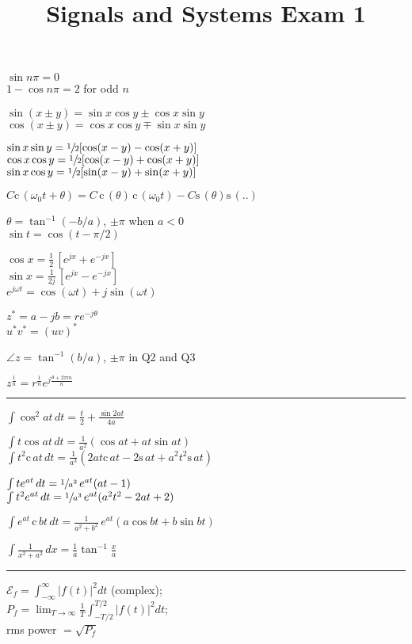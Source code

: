 \documentclass[6pt]{article}
\title{Signals and Systems Exam 1}
\theoremstyle{definition}
\theoremstyle{definition}
\renewcommand{\c}{\mathrm{c}\,}
\newcommand{\s}{\mathrm{s}\,}
\begin{document}
\raggedright
\begin{multicols*}{3} %
    $\sin n\pi = 0$\\
    $1-\cos n\pi = 2$ for odd $n$

    $\sin(x\pm y) = \sin x \cos y \pm \cos x \sin y$\\
    $\cos(x\pm y) = \cos x \cos y \mp \sin x \sin y$

    $\sin x \sin y = \sfrac{1}{2}[\cos(x-y) - \cos(x+y)]$\\
    $\cos x \cos y = \sfrac{1}{2}[\cos(x-y) + \cos(x+y)]$\\
    $\sin x \cos y = \sfrac{1}{2}[\sin(x-y) + \sin(x+y)]$

    $C \c(\omega_0 t + \theta) = C\,\c(\theta) \,\c(\omega_0 t) - C\s(\theta)\s(..)$

    $\theta = \tan^{-1} (-b/a)$, $\pm \pi$ when $a<0$\\
    $\sin t = \cos (t-\pi/2)$

    $\cos x = \frac{1}{2}\,[e^{jx} + e^{-jx}]$\\
    $\sin x = \frac{1}{2j}\, [e^{jx} - e^{-jx}]$\\
    $e^{j\omega t} = \cos(\omega t) + j\sin (\omega t)$

    $z^* = a-jb = re^{-j\theta}$\\
    $u^* v^* = (uv)^*$

    $\angle z = \tan^{-1}(b/a)$, $\pm \pi$ in Q2 and Q3

    $z^{\frac 1 n} = r^{\frac 1 n} e^{j \frac{\theta + 2\pi m}{n}}$
\rule{\linewidth}{0.5pt}
    $\int \cos^2 at \, dt = \frac{t}{2} + \frac{\sin2at}{4a}$

    $\int t \cos at \, dt = \frac{1}{a^2}(\cos at + at\sin at)$\\
    $\int t^2 \c at\, dt = \frac{1}{a^3}(2at\c at - 2\s at + a^2t^2\s at)$

    $\int te^{at}\, dt = \sfrac{1}{a^2} \, e^{at} (at-1)$\\
    $\int t^2 e^{at} \, dt = \sfrac{1}{a^3} \, e^{at} (a^2t^2 - 2at + 2)$

    $\int e^{at} \,\c bt \, dt = \frac{1}{a^2+b^2} \,e^{at}(a\cos 
    bt + b \sin bt)$

    \(\int \frac{1} {x^2+a^2}\, dx = \frac{1}{a} \tan^{-1} \frac x a\)
    \rule{\linewidth}{0.5pt}
    $\mathcal{E}_f = \int_{-\infty}^{\infty} |f(t)|^2 dt$ (complex); \\
    $P_f = \lim_{T\rightarrow\infty}\frac{1}{T} \int^{T/2}_{-T/2} |f(t)|^2 dt $; \\
    rms power $= \sqrt {P_f}$


\end{multicols*}
\end{document}
